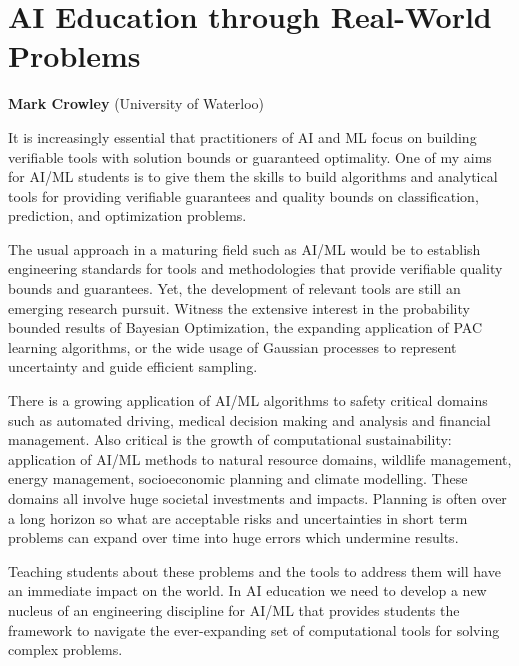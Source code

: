 \documentclass[letterpaper]{article}
\begin{document}
\section{AI Education through Real-World Problems}
\begin{center}
{\bf Mark Crowley} (University of Waterloo)
\end{center}

It is increasingly essential that practitioners of AI and ML focus on building verifiable tools with solution bounds or guaranteed optimality. One of my aims for AI/ML students is to give them the skills to build algorithms and analytical tools for providing verifiable guarantees and quality bounds on classification, prediction, and optimization problems. 

The usual approach in a maturing field such as AI/ML would be to establish engineering standards for tools and methodologies that provide verifiable quality bounds and guarantees. Yet, the development of relevant tools are still an emerging research pursuit. Witness the extensive interest in the probability bounded results of Bayesian Optimization, the expanding application of PAC learning algorithms, or the wide usage of Gaussian processes to represent uncertainty and guide efficient sampling. 

There is a growing application of AI/ML algorithms to safety critical domains such as automated driving, medical decision making and analysis and financial management. Also critical is the growth of computational sustainability: application of AI/ML methods to natural resource domains, wildlife management, energy management, socioeconomic planning and climate modelling. These domains all involve huge societal investments and impacts. Planning is often over a long horizon so what are acceptable risks and uncertainties in short term problems can expand over time into huge errors which undermine results.

Teaching students about these problems and the tools to address them will have an immediate impact on the world. In AI education we need to develop a new nucleus of an engineering discipline for AI/ML that provides students the framework to navigate the ever-expanding set of computational tools for solving complex problems.  
\end{document}
